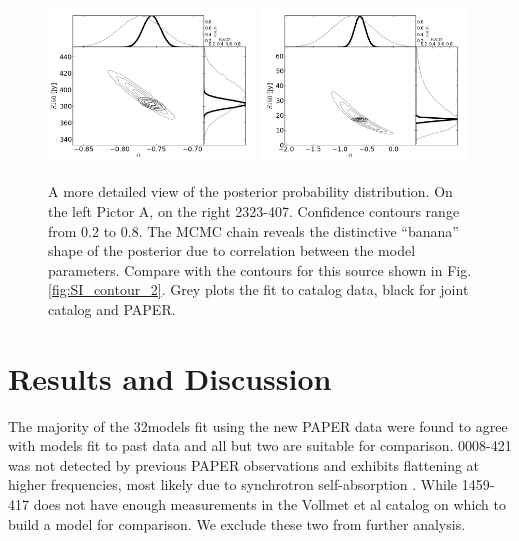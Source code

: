 \documentclass[preprint]{aastex}
\newcommand{\Nsrc}{32}
\begin{document}
\begin{figure}[htbp]
\includegraphics[width=0.49\textwidth]{plots/pic_trace_hist.png}
\includegraphics[width=0.49\textwidth]{plots/2323-407_trace_hist.png}
\caption{
A more detailed view of the posterior probability distribution. On the left
Pictor A, on the right 2323-407. Confidence contours range from 0.2 to 0.8. The MCMC
chain reveals the distinctive ``banana'' shape of the posterior
due to correlation between the model parameters.
Compare with the contours for this source shown in Fig. \ref{fig:SI_contour_2}.
Grey plots the fit to catalog data, black for joint catalog and PAPER.
}
\end{figure}




\section{Results and Discussion}
\label{sec:results}
The majority of the \Nsrc models fit using the new PAPER data were found to agree with
models fit to past data and all but two are suitable for comparison.  
0008-421 was not detected by previous PAPER observations and
exhibits flattening at higher frequencies, most likely due to synchrotron
self-absorption \citep{Jacobs:2011p8438}. While 1459-417 does not have enough 
measurements in the Vollmet et al catalog on which to build a model for comparison. We exclude these 
two from further analysis.
\end{document}
